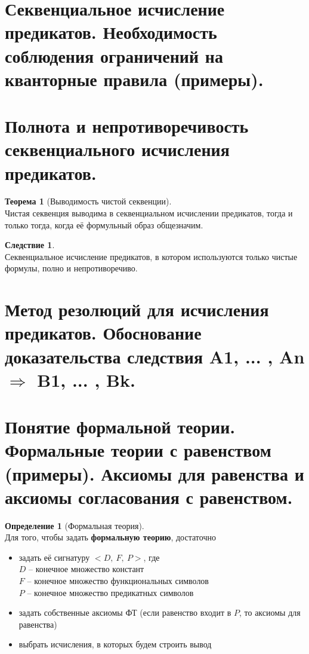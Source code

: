 \documentclass[a4paper,12pt]{article}
\theoremstyle{definition} %
\newtheorem{definition}{Определение}[section]
\newtheorem{theorem}{Теорема}[section]
\newtheorem{corollary}{Следствие}[section]
\theoremstyle{definition} %
\theoremstyle{remark} %
\begin{document}
\section{Секвенциальное исчисление предикатов. Необходимость соблюдения ограничений на кванторные правила (примеры).}

\section{Полнота и непротиворечивость секвенциального исчисления предикатов.}
	\begin{theorem}[Выводимость чистой секвенции]\ \\[1ex]
		Чистая секвенция выводима в секвенциальном исчислении предикатов, тогда и только тогда, когда её формульный образ общезначим.
	\end{theorem}

	\begin{corollary}\ \\[1ex]
		Секвенциальное исчисление предикатов, в котором используются только чистые формулы, полно и непротиворечиво.
	\end{corollary}

\section{Метод резолюций для исчисления предикатов. Обоснование доказательства следствия A1, ... ,	An $\Rightarrow$ B1, ... , Bk.}

\section{Понятие формальной теории. Формальные теории с равенством (примеры). Аксиомы для	равенства и аксиомы согласования с равенством.}

	\begin{definition}[Формальная теория]\ \\[1ex]
		Для того, чтобы задать \textbf{формальную теорию}, достаточно
		\begin{itemize}
			\item задать её сигнатуру $<D, \ F, \ P>$, где \\[1ex]
			$D$ -- конечное множество констант \\[1ex]
			$F$ -- конечное множество функциональных символов \\[1ex]
			$P$ -- конечное множество предикатных символов
			\item задать собственные аксиомы ФТ (если равенство входит в $P$, то аксиомы для равенства)
			\item выбрать исчисления, в которых будем строить вывод
		\end{itemize}
	\end{definition}
\end{document}
